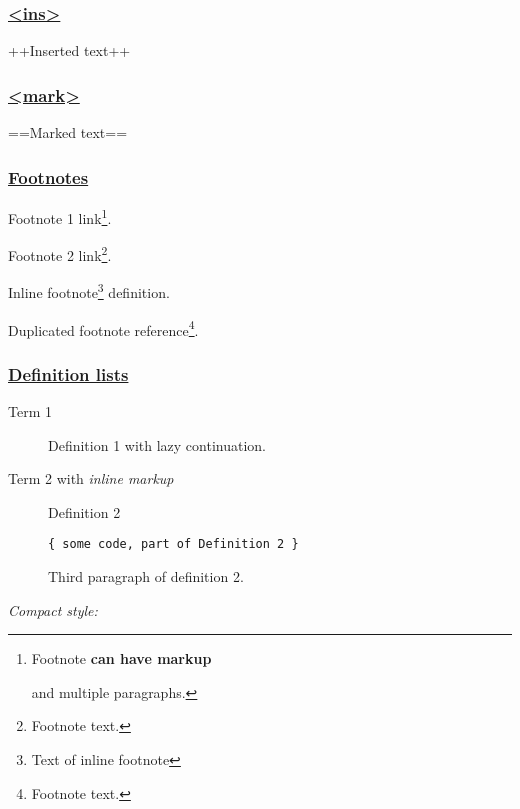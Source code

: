 \documentclass[]{article}
\begin{document}
\subsubsection{\texorpdfstring{\href{https://github.com/markdown-it/markdown-it-ins}{\textless{}ins\textgreater{}}}{\textless{}ins\textgreater{}}}\label{ins}

++Inserted text++

\subsubsection{\texorpdfstring{\href{https://github.com/markdown-it/markdown-it-mark}{\textless{}mark\textgreater{}}}{\textless{}mark\textgreater{}}}\label{mark}

==Marked text==

\subsubsection{\texorpdfstring{\href{https://github.com/markdown-it/markdown-it-footnote}{Footnotes}}{Footnotes}}\label{footnotes}

Footnote 1 link\footnote{Footnote \textbf{can have markup}

  and multiple paragraphs.}.

Footnote 2 link\footnote{Footnote text.}.

Inline footnote\footnote{Text of inline footnote} definition.

Duplicated footnote reference\footnote{Footnote text.}.

\subsubsection{\texorpdfstring{\href{https://github.com/markdown-it/markdown-it-deflist}{Definition
lists}}{Definition lists}}\label{definition-lists}

\begin{description}
\item[Term 1]
Definition 1 with lazy continuation.
\item[Term 2 with \emph{inline markup}]
Definition 2

\begin{verbatim}
{ some code, part of Definition 2 }
\end{verbatim}

Third paragraph of definition 2.
\end{description}

\emph{Compact style:}
\end{document}
